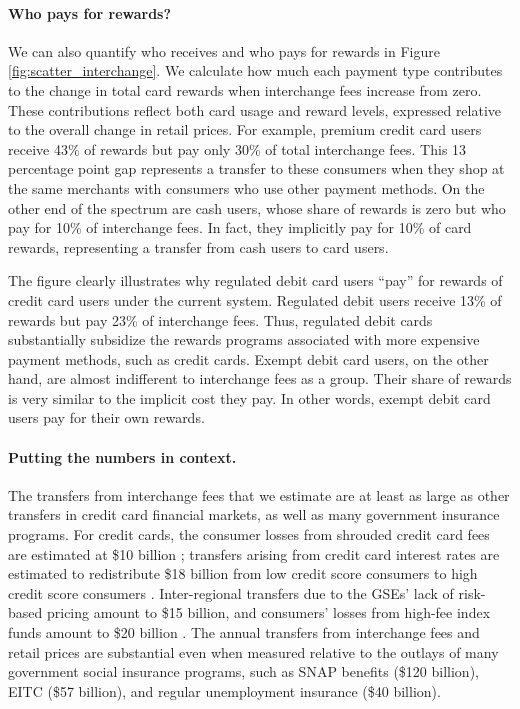 \documentclass[11pt,english]{article}
\theoremstyle{remark}
\begin{document}
\paragraph{Who pays for rewards?} 
We can also quantify who receives and who pays for rewards in Figure \ref{fig:scatter_interchange}.
We calculate how much each payment type contributes to the change in total card rewards when interchange fees increase from zero.
These contributions reflect both card usage and reward levels, expressed relative to the overall change in retail prices.
For example, premium credit card users receive 43\% of rewards but pay only 30\% of total interchange fees.
This 13 percentage point gap represents a transfer to these consumers when they shop at the same merchants with consumers who use other payment methods.
On the other end of the spectrum are cash users, whose share of rewards is zero but who pay for 10\% of interchange fees.
In fact, they implicitly pay for 10\% of card rewards, representing a transfer from cash users to card users.

The figure clearly illustrates why regulated debit card users ``pay'' for rewards of credit card users under the current system. Regulated debit users receive 13\% of rewards but pay 23\% of interchange fees.
Thus, regulated debit cards substantially subsidize the rewards programs associated with more expensive payment methods, such as credit cards.
Exempt debit card users, on the other hand, are almost indifferent to interchange fees as a group.
Their share of rewards is very similar to the implicit cost they pay.
In other words, exempt debit card users pay for their own rewards.

\paragraph{Putting the numbers in context.}

The transfers from interchange fees that we estimate are at least as large as other transfers in credit card financial markets, as well as many government insurance programs.
For credit cards, the consumer losses from shrouded credit card fees are estimated at \$10 billion \citep{agarwal2015regulating,Hurst.etal2016}; transfers arising from credit card interest rates are estimated to redistribute \$18 billion from low credit score consumers to high credit score consumers \citep{Agarwal.etal2022}.
Inter-regional transfers due to the GSEs' lack of risk-based pricing amount to \$15 billion, and consumers' losses from high-fee index funds amount to \$20 billion \citep{agarwal2015regulating,Hurst.etal2016}.
The annual transfers from interchange fees and retail prices are substantial even when measured relative to the outlays of many government social insurance programs, such as SNAP benefits (\$120 billion), EITC (\$57 billion), and regular unemployment insurance (\$40 billion).
\end{document}
